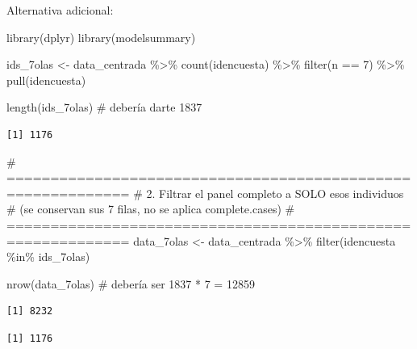 \documentclass[
  spanish,
  a4paper,
  oneside]{scrbook}
\newenvironment{Shaded}{\begin{snugshade}}{\end{snugshade}}
\newcommand{\CommentTok}[1]{\textcolor[rgb]{0.37,0.37,0.37}{#1}}
\newcommand{\DecValTok}[1]{\textcolor[rgb]{0.68,0.00,0.00}{#1}}
\newcommand{\FunctionTok}[1]{\textcolor[rgb]{0.28,0.35,0.67}{#1}}
\newcommand{\NormalTok}[1]{\textcolor[rgb]{0.00,0.23,0.31}{#1}}
\newcommand{\OtherTok}[1]{\textcolor[rgb]{0.00,0.23,0.31}{#1}}
\newcommand{\SpecialCharTok}[1]{\textcolor[rgb]{0.37,0.37,0.37}{#1}}
\begin{document}
Alternativa adicional:

\begin{Shaded}
\begin{Highlighting}[]
\FunctionTok{library}\NormalTok{(dplyr)}
\FunctionTok{library}\NormalTok{(modelsummary)}

\NormalTok{ids\_7olas }\OtherTok{\textless{}{-}}\NormalTok{ data\_centrada }\SpecialCharTok{\%\textgreater{}\%}
  \FunctionTok{count}\NormalTok{(idencuesta) }\SpecialCharTok{\%\textgreater{}\%}
  \FunctionTok{filter}\NormalTok{(n }\SpecialCharTok{==} \DecValTok{7}\NormalTok{) }\SpecialCharTok{\%\textgreater{}\%}
  \FunctionTok{pull}\NormalTok{(idencuesta)}

\FunctionTok{length}\NormalTok{(ids\_7olas)  }\CommentTok{\# debería darte 1837}
\end{Highlighting}
\end{Shaded}

\begin{verbatim}
[1] 1176
\end{verbatim}

\begin{Shaded}
\begin{Highlighting}[]
\CommentTok{\# ============================================================}
\CommentTok{\# 2. Filtrar el panel completo a SOLO esos individuos}
\CommentTok{\#    (se conservan sus 7 filas, no se aplica complete.cases)}
\CommentTok{\# ============================================================}
\NormalTok{data\_7olas }\OtherTok{\textless{}{-}}\NormalTok{ data\_centrada }\SpecialCharTok{\%\textgreater{}\%}
  \FunctionTok{filter}\NormalTok{(idencuesta }\SpecialCharTok{\%in\%}\NormalTok{ ids\_7olas)}

\FunctionTok{nrow}\NormalTok{(data\_7olas)                       }\CommentTok{\# debería ser 1837 * 7 = 12859}
\end{Highlighting}
\end{Shaded}

\begin{verbatim}
[1] 8232
\end{verbatim}

\begin{Shaded}
\end{Shaded}

\begin{verbatim}
[1] 1176
\end{verbatim}
\end{document}
